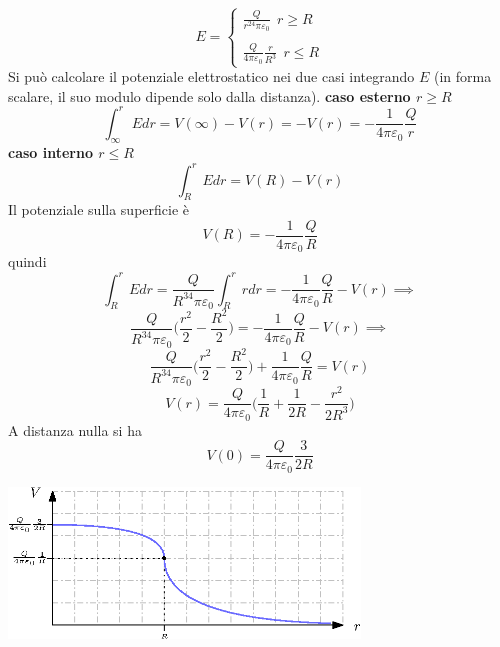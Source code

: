 \documentclass[10pt, letterpaper]{report}
\begin{document}
$$ E=\begin{cases}
   \displaystyle \frac{Q}{r^24\pi\varepsilon_0} \ \ r\ge R \\ \\
   \displaystyle  \frac{Q}{4\pi\varepsilon_0}\frac{r}{R^3}\ \ r\le R 
\end{cases}$$
Si può calcolare il potenziale elettrostatico nei due casi integrando $E$ (in forma scalare, il suo modulo dipende solo dalla distanza).\acc  
\textbf{caso esterno $r\ge R$} 
$$ \int_{\infty}^r E dr = V(\infty)-V(r)=-V(r)=-\frac{1}{4\pi\varepsilon_0}\frac{Q}{r}$$
\textbf{caso interno $r\le R$}
$$ \int_{R}^r E dr = V(R)-V(r)$$
Il potenziale sulla superficie è 
$$ V(R)=-\frac{1}{4\pi\varepsilon_0}\frac{Q}{R}$$
quindi 
$$ \int_{R}^r E dr=\frac{Q}{R^34\pi\varepsilon_0}\int_{R}^r r dr = -\frac{1}{4\pi\varepsilon_0}\frac{Q}{R}-V(r) \implies $$
$$ \frac{Q}{R^34\pi\varepsilon_0}\Big( \frac{r^2}{2}-\frac{R^2}{2}\Big) = -\frac{1}{4\pi\varepsilon_0}\frac{Q}{R}-V(r) \implies $$
$$ \frac{Q}{R^34\pi\varepsilon_0}\Big( \frac{r^2}{2}-\frac{R^2}{2}\Big)  +\frac{1}{4\pi\varepsilon_0}\frac{Q}{R}=V(r) $$
$$ V(r)=\frac{Q}{4\pi\varepsilon_0}\Big( \frac{1}{R}+\frac{1}{2R}-\frac{r^2}{2R^3} \Big)$$
A distanza nulla si ha 
$$ V(0)=\frac{Q}{4\pi\varepsilon_0}\frac{3}{2R} $$
\begin{center}
    \includegraphics[width=0.7\textwidth]{images/potenzialeSfera.eps}
\end{center}\flowerLine 
\end{document}

